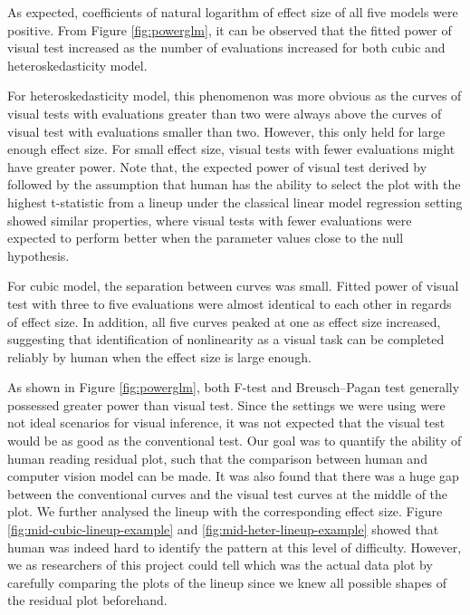 \documentclass{monashthesis}
\theoremstyle{definition}
\theoremstyle{definition}
\theoremstyle{definition}
\theoremstyle{definition}
\theoremstyle{remark}
\begin{document}
As expected, coefficients of natural logarithm of effect size of all five models were positive. From Figure \ref{fig:powerglm}, it can be observed that the fitted power of visual test increased as the number of evaluations increased for both cubic and heteroskedasticity model.

For heteroskedasticity model, this phenomenon was more obvious as the curves of visual tests with evaluations greater than two were always above the curves of visual test with evaluations smaller than two. However, this only held for large enough effect size. For small effect size, visual tests with fewer evaluations might have greater power. Note that, the expected power of visual test derived by \textcite{majumder_validation_2013} followed by the assumption that human has the ability to select the plot with the highest t-statistic from a lineup under the classical linear model regression setting showed similar properties, where visual tests with fewer evaluations were expected to perform better when the parameter values close to the null hypothesis.

For cubic model, the separation between curves was small. Fitted power of visual test with three to five evaluations were almost identical to each other in regards of effect size. In addition, all five curves peaked at one as effect size increased, suggesting that identification of nonlinearity as a visual task can be completed reliably by human when the effect size is large enough.

As shown in Figure \ref{fig:powerglm}, both F-test and Breusch--Pagan test generally possessed greater power than visual test. Since the settings we were using were not ideal scenarios for visual inference, it was not expected that the visual test would be as good as the conventional test. Our goal was to quantify the ability of human reading residual plot, such that the comparison between human and computer vision model can be made. It was also found that there was a huge gap between the conventional curves and the visual test curves at the middle of the plot. We further analysed the lineup with the corresponding effect size. Figure \ref{fig:mid-cubic-lineup-example} and \ref{fig:mid-heter-lineup-example} showed that human was indeed hard to identify the pattern at this level of difficulty. However, we as researchers of this project could tell which was the actual data plot by carefully comparing the plots of the lineup since we knew all possible shapes of the residual plot beforehand.
\end{document}
